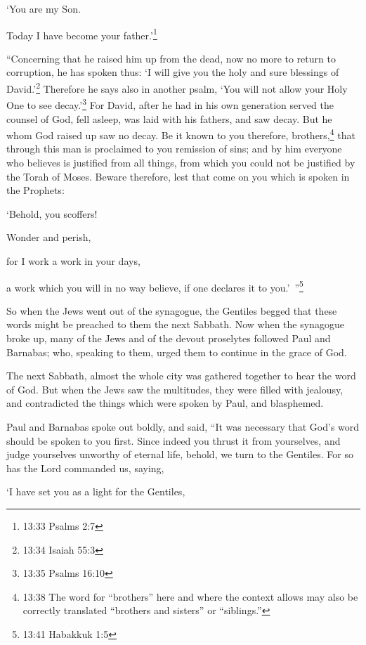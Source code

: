 ‘You are my Son.

Today I have become your father.’\footnote{13:33 Psalms 2:7}

\myverse{}“Concerning that he raised him up from the dead, now no more
to return to corruption, he has spoken thus: ‘I will give you the holy and sure blessings of David.’\footnote{13:34 Isaiah 55:3}
\myverse{}Therefore he says also in another psalm, ‘You will not allow your Holy One
to see decay.’\footnote{13:35 Psalms 16:10}
\myverse{}For David, after he had in his own generation served the counsel of God,
fell asleep, was laid with his fathers, and saw decay.
\myverse{}But he whom God raised up saw no decay.
\myverse{}Be it known to you therefore, brothers,\footnote{13:38 The word for “brothers” here and where the context allows may also be correctly translated “brothers
	and sisters” or “siblings.”} that through this man is proclaimed to you remission of sins;
\myverse{}and by him everyone who believes is justified from all things, from which
you could not be justified by the Torah of Moses.
\myverse{}Beware therefore, lest that come on you which is spoken in the Prophets:

\myverse{}‘Behold, you scoffers!

Wonder and perish,

for I work a work in your days,

a work which you will in no way believe, if one declares it to you.’ ”\footnote{13:41 Habakkuk 1:5}

\myverse{}So when the Jews went out of the synagogue, the Gentiles begged
that these words might be preached to them the next Sabbath.
\myverse{}Now when the synagogue broke up, many of the Jews and of the devout proselytes
followed Paul and Barnabas; who, speaking to them, urged them to continue in the grace of God.

\myverse{}The next Sabbath, almost the whole city was gathered together
to hear the word of God.
\myverse{}But when the Jews saw the multitudes, they were filled with jealousy, and
contradicted the things which were spoken by Paul, and blasphemed.

\myverse{}Paul and Barnabas spoke out boldly, and said, “It was necessary
that God’s word should be spoken to you first. Since indeed you thrust it from yourselves, and judge yourselves
unworthy of eternal life, behold, we turn to the Gentiles.
\myverse{}For so has the Lord commanded us, saying,

‘I have set you as a light for the Gentiles,

